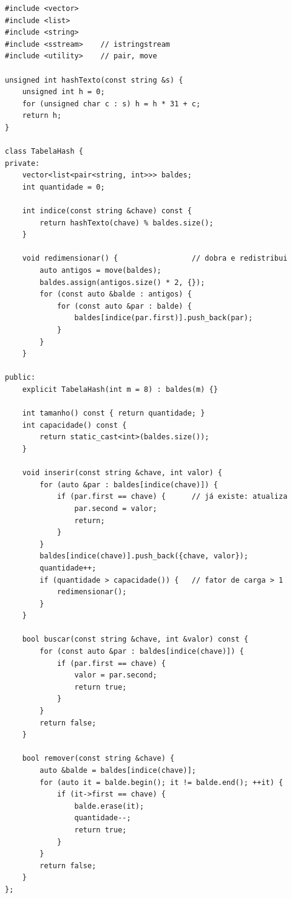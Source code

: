 \begin{codigo}
\begin{Verbatim}[breaklines=true, breaksymbolleft={}, fontsize=\footnotesize]
#include <vector>
#include <list>
#include <string>
#include <sstream>    // istringstream
#include <utility>    // pair, move

unsigned int hashTexto(const string &s) {
    unsigned int h = 0;
    for (unsigned char c : s) h = h * 31 + c;
    return h;
}

class TabelaHash {
private:
    vector<list<pair<string, int>>> baldes;
    int quantidade = 0;

    int indice(const string &chave) const {
        return hashTexto(chave) % baldes.size();
    }

    void redimensionar() {                 // dobra e redistribui
        auto antigos = move(baldes);
        baldes.assign(antigos.size() * 2, {});
        for (const auto &balde : antigos) {
            for (const auto &par : balde) {
                baldes[indice(par.first)].push_back(par);
            }
        }
    }

public:
    explicit TabelaHash(int m = 8) : baldes(m) {}

    int tamanho() const { return quantidade; }
    int capacidade() const {
        return static_cast<int>(baldes.size());
    }

    void inserir(const string &chave, int valor) {
        for (auto &par : baldes[indice(chave)]) {
            if (par.first == chave) {      // já existe: atualiza
                par.second = valor;
                return;
            }
        }
        baldes[indice(chave)].push_back({chave, valor});
        quantidade++;
        if (quantidade > capacidade()) {   // fator de carga > 1
            redimensionar();
        }
    }

    bool buscar(const string &chave, int &valor) const {
        for (const auto &par : baldes[indice(chave)]) {
            if (par.first == chave) {
                valor = par.second;
                return true;
            }
        }
        return false;
    }

    bool remover(const string &chave) {
        auto &balde = baldes[indice(chave)];
        for (auto it = balde.begin(); it != balde.end(); ++it) {
            if (it->first == chave) {
                balde.erase(it);
                quantidade--;
                return true;
            }
        }
        return false;
    }
};


\end{Verbatim}
\end{codigo}
